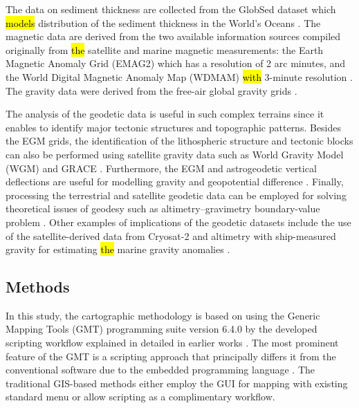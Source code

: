 \documentclass[geomatics,article,submit,pdftex,moreauthors]{Definitions/mdpi}
\begin{document}
The data on sediment thickness are collected from the GlobSed dataset which \hl{models }distribution of the sediment thickness in the World's Oceans \cite{Straume}. The magnetic data are derived from the two available information sources compiled originally from \hl{the }satellite and marine magnetic measurements: the Earth Magnetic Anomaly Grid (EMAG2) \cite{Maus} which has a resolution of 2 arc minutes, and the World Digital Magnetic Anomaly Map (WDMAM) \hl{with} 3-minute resolution \cite{Lesur}. The gravity data were derived from the free-air global gravity grids \cite{Sandwell}.

The analysis of the geodetic data is useful in such complex terrains since it enables to identify major tectonic structures and topographic patterns. Besides the EGM grids, the identification of the lithospheric structure\hl{ }and tectonic blocks can also be performed using\hl{ }satellite gravity data such as World Gravity Model (WGM) and\hl{ }GRACE\hl{ }\cite{EMISHAW2023104775}. Furthermore, the EGM and astrogeodetic vertical deflections are useful for modelling gravity and geopotential difference \cite{WANG2023}. Finally, processing the terrestrial and satellite geodetic data can be employed for solving theoretical issues of geodesy such as altimetry–gravimetry boundary-value problem \cite{Lehmann}. Other examples of implications of the geodetic datasets include the use of the satellite-derived data from Cryosat-2 and altimetry with ship-measured gravity\hl{ }for estimating \hl{the }marine gravity anomalies \cite{NGUYEN2020505}.

\subsection{Methods}

In this study, the cartographic methodology is based on using the Generic Mapping Tools (GMT) programming suite version 6.4.0 \cite{Wessel} by the developed scripting workflow explained in detailed in earlier works \cite{Lemenkova202212,Lemenkova202203}. The most prominent feature of the GMT is\hl{ }a scripting approach that principally differs it from the conventional software due to the embedded programming language  \cite{WesselLuis}. The traditional GIS-based methods either employ the\hl{ }GUI\hl{ }for mapping\hl{ }with existing standard\hl{ }menu\hl{ }or allow scripting as a complimentary workflow. 
\end{document}

